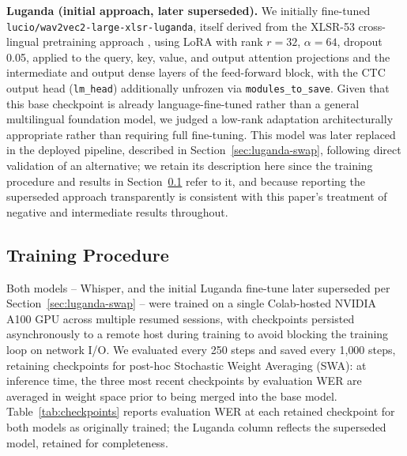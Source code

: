 \documentclass[11pt]{article}
\begin{document}
\textbf{Luganda (initial approach, later superseded).} We initially fine-tuned \texttt{lucio/wav2vec2-\allowbreak large-\allowbreak xlsr-\allowbreak luganda}, itself derived from the XLSR-53 cross-lingual pretraining approach \cite{conneau2021xlsr}, using LoRA with rank $r=32$, $\alpha=64$, dropout 0.05, applied to the query, key, value, and output attention projections and the intermediate and output dense layers of the feed-forward block, with the CTC output head (\texttt{lm\_head}) additionally unfrozen via \texttt{modules\_to\_save}. Given that this base checkpoint is already language-fine-tuned rather than a general multilingual foundation model, we judged a low-rank adaptation architecturally appropriate rather than requiring full fine-tuning. This model was later replaced in the deployed pipeline, described in Section~\ref{sec:luganda-swap}, following direct validation of an alternative; we retain its description here since the training procedure and results in Section~\ref{sec:training} refer to it, and because reporting the superseded approach transparently is consistent with this paper's treatment of negative and intermediate results throughout.

\subsection{Training Procedure}
\label{sec:training}

Both models -- Whisper, and the initial Luganda fine-tune later superseded per Section~\ref{sec:luganda-swap} -- were trained on a single Colab-hosted NVIDIA A100 GPU across multiple resumed sessions, with checkpoints persisted asynchronously to a remote host during training to avoid blocking the training loop on network I/O. We evaluated every 250 steps and saved every 1{,}000 steps, retaining checkpoints for post-hoc Stochastic Weight Averaging (SWA): at inference time, the three most recent checkpoints by evaluation WER are averaged in weight space prior to being merged into the base model. Table~\ref{tab:checkpoints} reports evaluation WER at each retained checkpoint for both models as originally trained; the Luganda column reflects the superseded model, retained for completeness.
\end{document}

